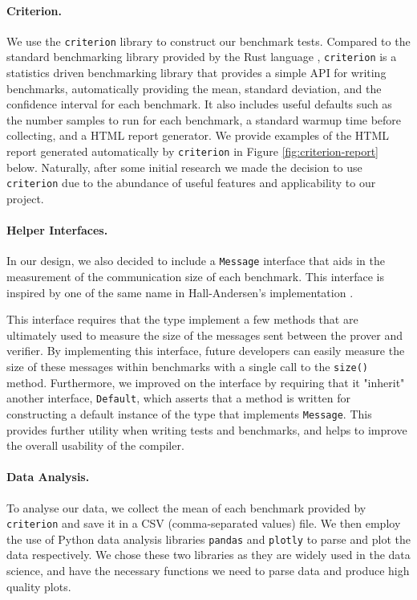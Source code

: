 \paragraph{Criterion.} We use the \texttt{criterion} library \cite{criterion} to construct our 
benchmark tests. Compared to the standard benchmarking library provided by the Rust language \cite{cargo-bench},
\texttt{criterion} is a statistics driven benchmarking library that provides a simple API for writing benchmarks, 
automatically providing the mean, standard deviation, and the confidence interval for each benchmark. 
It also includes useful defaults such as the number samples to run for each benchmark, a standard 
warmup time before collecting, and a HTML report generator. We provide examples of 
the HTML report generated automatically by \texttt{criterion} in Figure 
\ref{fig:criterion-report} below. 
Naturally, after some initial research we made the decision to use \texttt{criterion}
due to the abundance of useful features and applicability to our project. 

\paragraph{Helper Interfaces.} In our design, we also decided 
to include a \texttt{Message} interface that aids in the measurement of the 
communication size of each benchmark. This interface is inspired by one of 
the same name in Hall-Andersen's implementation \cite{MHAStackSig}. 

This interface requires that the type implement a few methods that are ultimately
used to measure the size of the messages sent between the prover and verifier. 
By implementing this interface, future developers can easily measure the size 
of these messages within benchmarks with a single call to the \texttt{size()} method. 
Furthermore, we improved on the interface by requiring that it "inherit" another interface, 
\texttt{Default}, which asserts that a method is written for constructing
a default instance of the type that implements \texttt{Message}. This provides 
further utility when writing tests and benchmarks, and helps to improve the 
overall usability of the compiler.

\paragraph{Data Analysis.} To analyse our data, we collect the mean 
of each benchmark provided by \texttt{criterion} \cite{criterion} and save it in a 
CSV (comma-separated values) file. We then employ the use of Python data analysis libraries 
\texttt{pandas} \cite{reback2020pandas,mckinney-proc-scipy-2010} 
and \texttt{plotly} \cite{plotly} to parse and plot the data 
respectively. We chose these two libraries as they are widely used in the data science, 
and have the necessary functions we need to parse data and produce high quality plots.

